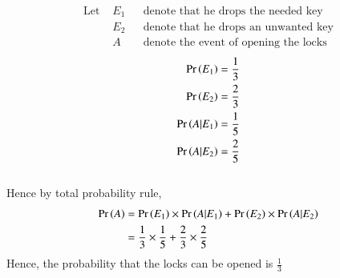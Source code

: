 
\begin{align*}
\text{Let } &E_1  &&\text{denote that he drops the needed key}\\
&E_2  &&\text{denote that he drops an unwanted key}\\
&A  &&\text{denote the event of opening the locks}
\end{align*}
\begin{align}
\Pr\left(E_1\right) &= \frac{1}{3}\\
\Pr\left(E_2\right) &= \frac{2}{3}\\
\Pr\left(A|E_1\right) &= \frac{1}{5}\\
\Pr\left(A|E_2\right) &= \frac{2}{5}
\end{align}\\
Hence by total probability rule,
\begin{align}
\Pr\left(A\right) &= \Pr\left(E_1\right)\times \Pr\left(A|E_1\right) + \Pr\left(E_2\right)\times \Pr\left(A|E_2\right)\\
&= \frac{1}{3}\times\frac{1}{5} + \frac{2}{3}\times\frac{2}{5}
\end{align}
Hence, the probability that the locks can be opened is $\frac{1}{3}$